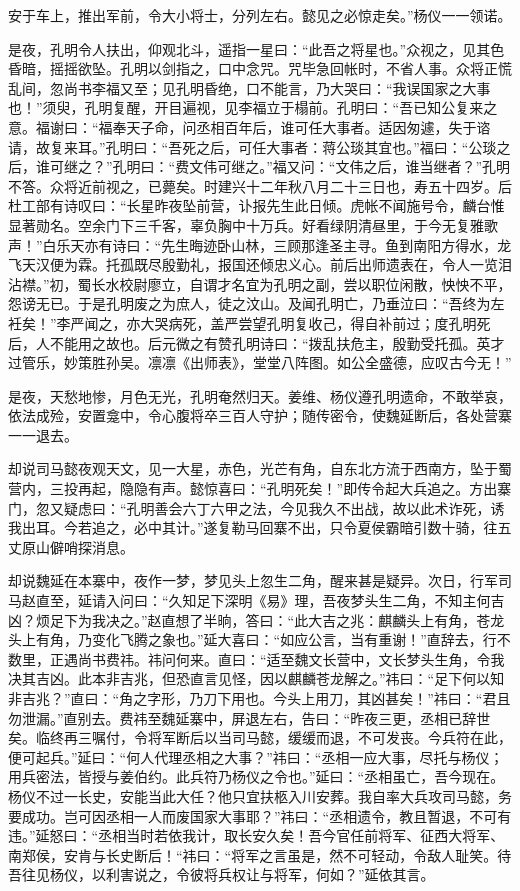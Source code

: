 安于车上，推出军前，令大小将士，分列左右。懿见之必惊走矣。”杨仪一一领诺。

是夜，孔明令人扶出，仰观北斗，遥指一星曰：“此吾之将星也。”众视之，见其色昏暗，摇摇欲坠。孔明以剑指之，口中念咒。咒毕急回帐时，不省人事。众将正慌乱间，忽尚书李福又至；见孔明昏绝，口不能言，乃大哭曰：“我误国家之大事也！”须臾，孔明复醒，开目遍视，见李福立于榻前。孔明曰：“吾已知公复来之意。福谢曰：“福奉天子命，问丞相百年后，谁可任大事者。适因匆遽，失于谘请，故复来耳。”孔明曰：“吾死之后，可任大事者：蒋公琰其宜也。”福曰：“公琰之后，谁可继之？”孔明曰：“费文伟可继之。”福又问：“文伟之后，谁当继者？”孔明不答。众将近前视之，已薨矣。时建兴十二年秋八月二十三日也，寿五十四岁。后杜工部有诗叹曰：“长星昨夜坠前营，讣报先生此日倾。虎帐不闻施号令，麟台惟显著勋名。空余门下三千客，辜负胸中十万兵。好看绿阴清昼里，于今无复雅歌声！”白乐天亦有诗曰：“先生晦迹卧山林，三顾那逢圣主寻。鱼到南阳方得水，龙飞天汉便为霖。托孤既尽殷勤礼，报国还倾忠义心。前后出师遗表在，令人一览泪沾襟。”初，蜀长水校尉廖立，自谓才名宜为孔明之副，尝以职位闲散，怏怏不平，怨谤无已。于是孔明废之为庶人，徒之汶山。及闻孔明亡，乃垂泣曰：“吾终为左衽矣！”李严闻之，亦大哭病死，盖严尝望孔明复收己，得自补前过；度孔明死后，人不能用之故也。后元微之有赞孔明诗曰：“拨乱扶危主，殷勤受托孤。英才过管乐，妙策胜孙吴。凛凛《出师表》，堂堂八阵图。如公全盛德，应叹古今无！”

是夜，天愁地惨，月色无光，孔明奄然归天。姜维、杨仪遵孔明遗命，不敢举哀，依法成殓，安置龛中，令心腹将卒三百人守护；随传密令，使魏延断后，各处营寨一一退去。

却说司马懿夜观天文，见一大星，赤色，光芒有角，自东北方流于西南方，坠于蜀营内，三投再起，隐隐有声。懿惊喜曰：“孔明死矣！”即传令起大兵追之。方出寨门，忽又疑虑曰：“孔明善会六丁六甲之法，今见我久不出战，故以此术诈死，诱我出耳。今若追之，必中其计。”遂复勒马回寨不出，只令夏侯霸暗引数十骑，往五丈原山僻哨探消息。

却说魏延在本寨中，夜作一梦，梦见头上忽生二角，醒来甚是疑异。次日，行军司马赵直至，延请入问曰：“久知足下深明《易》理，吾夜梦头生二角，不知主何吉凶？烦足下为我决之。”赵直想了半晌，答曰：“此大吉之兆：麒麟头上有角，苍龙头上有角，乃变化飞腾之象也。”延大喜曰：“如应公言，当有重谢！”直辞去，行不数里，正遇尚书费祎。祎问何来。直曰：“适至魏文长营中，文长梦头生角，令我决其吉凶。此本非吉兆，但恐直言见怪，因以麒麟苍龙解之。”祎曰：“足下何以知非吉兆？”直曰：“角之字形，乃刀下用也。今头上用刀，其凶甚矣！”祎曰：“君且勿泄漏。”直别去。费祎至魏延寨中，屏退左右，告曰：“昨夜三更，丞相已辞世矣。临终再三嘱付，令将军断后以当司马懿，缓缓而退，不可发丧。今兵符在此，便可起兵。”延曰：“何人代理丞相之大事？”祎曰：“丞相一应大事，尽托与杨仪；用兵密法，皆授与姜伯约。此兵符乃杨仪之令也。”延曰：“丞相虽亡，吾今现在。杨仪不过一长史，安能当此大任？他只宜扶柩入川安葬。我自率大兵攻司马懿，务要成功。岂可因丞相一人而废国家大事耶？”祎曰：“丞相遗令，教且暂退，不可有违。”延怒曰：“丞相当时若依我计，取长安久矣！吾今官任前将军、征西大将军、南郑侯，安肯与长史断后！“祎曰：“将军之言虽是，然不可轻动，令敌人耻笑。待吾往见杨仪，以利害说之，令彼将兵权让与将军，何如？”延依其言。

